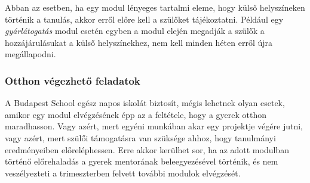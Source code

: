Abban az esetben, ha egy modul lényeges tartalmi eleme, hogy külső helyszíneken történik a tanulás, akkor erről előre kell a szülőket tájékoztatni. Például egy \emph{gyárlátogatás} modul esetén egyben a modul elején megadják a szülők a hozzájárulásukat a külső helyszínekhez, nem kell minden héten erről újra megállapodni.

\subsubsection{Otthon végezhető feladatok}

A Budapest School egész napos iskolát biztosít, mégis lehetnek olyan esetek, amikor egy modul elvégzésének épp az a feltétele, hogy a gyerek otthon maradhasson. Vagy azért, mert egyéni munkában akar egy projektje végére jutni, vagy azért, mert szülői támogatásra van szüksége ahhoz, hogy tanulmányi eredményeiben előreléphessen. Erre akkor kerülhet sor, ha az adott modulban történő előrehaladás a gyerek mentorának beleegyezésével történik, és nem veszélyezteti a trimeszterben felvett további modulok elvégzését.

